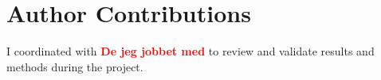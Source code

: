 \section{Author Contributions}

I coordinated with \textcolor{red}{\textbf{De jeg jobbet med}} to review and validate results and methods during the project.
